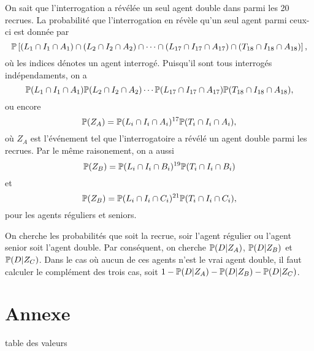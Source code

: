 \documentclass[11pt]{article}
\renewcommand\P{%
    \ensuremath{%
        \mathbb{P}%
    }%
}
\begin{document}
On sait que l'interrogation a révélée un seul agent double dans parmi
les 20 recrues. La probabilité que l'interrogation en révèle qu'un seul
agent parmi ceux-ci est donnée par
\begin{equation*}
    \P\left[
        (L_1\cap I_1\cap A_1)\cap
        (L_2\cap I_2\cap A_2)\cap\cdots\cap
        (L_{17}\cap I_{17}\cap A_{17})\cap
        (T_{18}\cap I_{18}\cap A_{18})
    \right],
\end{equation*}
où les indices dénotes un agent interrogé. Puisqu'il sont tous interrogés
indépendaments, on a
\begin{equation*}
    \P(L_1\cap I_1\cap A_1)
    \P(L_2\cap I_2\cap A_2)\cdots
    \P(L_{17}\cap I_{17}\cap A_{17})
    \P(T_{18}\cap I_{18}\cap A_{18}),
\end{equation*}
ou encore
\begin{equation*}
    \P(Z_A)=
    \P(L_i\cap I_i\cap A_i)^{17}
    \P(T_i\cap I_i\cap A_i),
\end{equation*}
où $Z_A$ est l'événement tel que l'interrogatoire a révélé un agent double
parmi les recrues. Par le même raisonement, on a aussi
\begin{equation*}
    \P(Z_B)=
    \P(L_i\cap I_i\cap B_i)^{19}
    \P(T_i\cap I_i\cap B_i)
\end{equation*}
et
\begin{equation*}
    \P(Z_B)=
    \P(L_i\cap I_i\cap C_i)^{21}
    \P(T_i\cap I_i\cap C_i),
\end{equation*}
pour les agents réguliers et seniors.

On cherche les probabilités que soit la recrue, soir l'agent régulier ou
l'agent senior soit l'agent double. Par conséquent, on cherche $\P(D|Z_A)$,
$\P(D|Z_B)$ et $\P(D|Z_C)$. Dans le cas où aucun de ces agents n'est le vrai
agent double, il faut calculer le complément des trois cas, soit $1-\P(D|Z_A)-
\P(D|Z_B)-\P(D|Z_C)$.

\pagebreak
\section*{Annexe}
\begin{table}[H]
    \centering
	\caption{table des valeurs}
    
\end{table}
\end{document}
